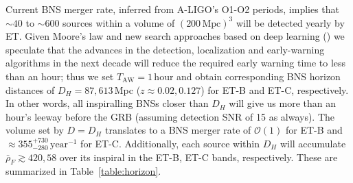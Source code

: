 \documentclass[amsmath,amssymb,aps,floats,amsfonts,notitlepage,superscriptaddress,eqsecnum,nofootinbib,10pt]{revtex4-1}
\begin{document}
Current BNS merger rate, inferred from A-LIGO's O1-O2 periods, implies that $\sim 40$ to $\sim600$ sources within a volume of $(200\,\text{Mpc})^3$ will be detected yearly by ET.
Given Moore's law and new search approaches based on deep learning (\cite{Gabbard:2017lja}) we speculate
that the advances in the detection, localization and early-warning algorithms in the next decade will reduce the required early
warning time to less than an hour; thus we set $T_\text{AW} = 1\,\text{hour}$ and obtain corresponding BNS horizon distances of $D_H=87,613\,$Mpc ($z\approx 0.02,0.127$) for ET-B and ET-C, respectively.
In other words, all inspiralling BNSs closer than $D_H$ will give us more than an hour's leeway before the GRB (assuming detection SNR of 15 as always).
The volume set by $D=D_H$ translates to a BNS merger rate of $\mathcal{O}(1)$ for ET-B and
$\approx 355^{+730}_{-280}\,\text{year}^{-1}$ for ET-C. Additionally, each source within $D_H$ will accumulate $\bar\rho_F \gtrsim 420, 58$ over its inspiral
in the ET-B, ET-C bands, respectively. These are summarized in Table~\ref{table:horizon}.
\end{document}
